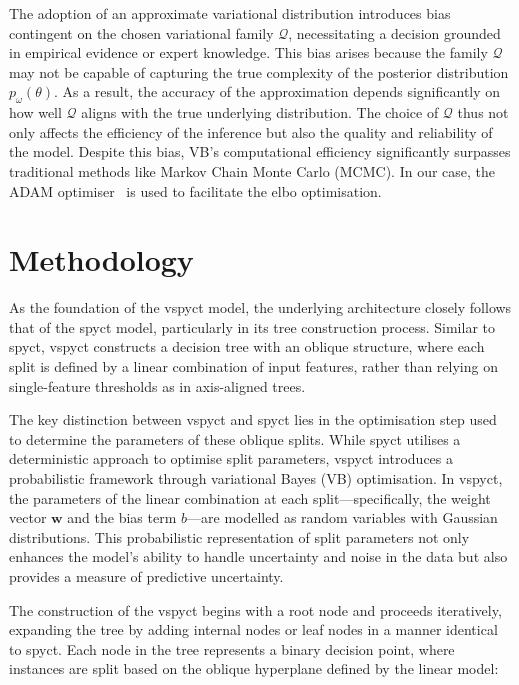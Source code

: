 \documentclass[3p,review,authoryear]{elsarticle}
\begin{document}
The adoption of an approximate variational distribution introduces bias contingent on the chosen variational family $\mathcal{Q}$, necessitating a decision grounded in empirical evidence or expert knowledge.
This bias arises because the family \(\mathcal{Q}\) may not be capable of capturing the true complexity of the posterior distribution \(p_\omega(\theta)\).
As a result, the accuracy of the approximation depends significantly on how well \(\mathcal{Q}\) aligns with the true underlying distribution.
The choice of \(\mathcal{Q}\) thus not only affects the efficiency of the inference but also the quality and reliability of the model.
Despite this bias, VB's computational efficiency significantly surpasses traditional methods like Markov Chain Monte Carlo (MCMC).
In our case, the ADAM optimiser~\citep{kingma2014adam} is used to facilitate the \gls{elbo} optimisation.


\section{Methodology}

As the foundation of the \gls{vspyct} model, the underlying architecture closely follows that of the \gls{spyct} model, particularly in its tree construction process.
Similar to \gls{spyct}, \gls{vspyct} constructs a decision tree with an oblique structure, where each split is defined by a linear combination of input features, rather than relying on single-feature thresholds as in axis-aligned trees.

The key distinction between \gls{vspyct} and \gls{spyct} lies in the optimisation step used to determine the parameters of these oblique splits.
While \gls{spyct} utilises a deterministic approach to optimise split parameters, \gls{vspyct} introduces a probabilistic framework through variational Bayes (VB) optimisation.
In \gls{vspyct}, the parameters of the linear combination at each split—specifically, the weight vector \(\mathbf{w}\) and the bias term \(b\)—are modelled as random variables with Gaussian distributions.
This probabilistic representation of split parameters not only enhances the model's ability to handle uncertainty and noise in the data but also provides a measure of predictive uncertainty.

The construction of the \gls{vspyct} begins with a root node and proceeds iteratively, expanding the tree by adding internal nodes or leaf nodes in a manner identical to \gls{spyct}. Each node in the tree represents a binary decision point, where instances are split based on the oblique hyperplane defined by the linear model:
\end{document}

